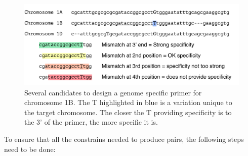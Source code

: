 \begin{figure}
\includegraphics[width=1\textwidth]{PolyMarker/Figures/intro/specificPosition.pdf}
\caption{Several candidates to design a genome specific primer for chromosome 1B. The T highlighted in blue is a variation unique to the target chromosome. The closer the T providing specificity is to the 3' of the primer, the more specific it is. }
\label{fig:poly:3PrimeRules}
\end{figure}


To ensure that all the constrains needed to produce pairs, the following steps need to be done: 

